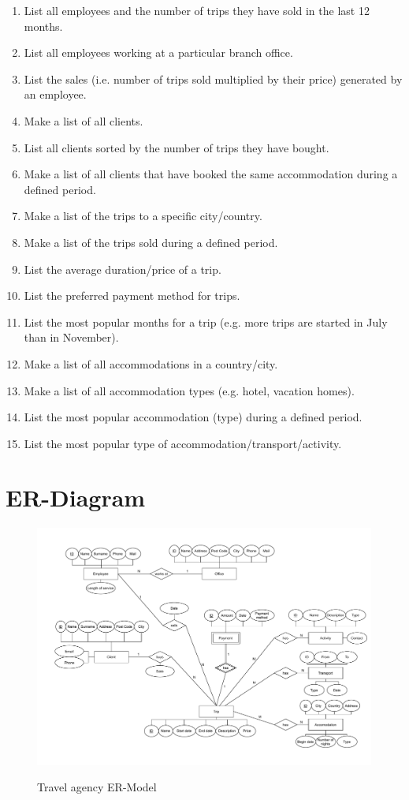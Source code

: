 \documentclass{article}
\begin{document}
			\begin{enumerate}
				\item List all employees and the number of trips they have sold in the last 12 months.
				\item List all employees working at a particular branch office.
				\item List the sales (i.e. number of trips sold multiplied by their price) generated by an employee. 
				\item Make a list of all clients.
				\item List all clients sorted by the number of trips they have bought.
				\item Make a list of all clients that have booked the same accommodation 	during a defined period.
				\item Make a list of the trips to a specific city/country. 
				\item Make a list of the trips sold during a defined period.
				\item List the average duration/price of a trip.
				\item List the preferred payment method for trips.
				\item List the most popular months for a trip (e.g. more trips are started in July than in November).
				\item Make a list of all accommodations in a country/city. 
				\item Make a list of all accommodation types (e.g. hotel, vacation homes).
				\item List the most popular accommodation (type) during a defined period.
				\item List the most popular type of accommodation/transport/activity.
			\end{enumerate}	

	\newpage
	
	\section*{ER-Diagram}
	\begin{figure}[htbp]
		\centering
			\includegraphics[width=1.15\textwidth, angle=90]{../Proposition 2.pdf}
		\label{ER-Model}
		\caption{Travel agency ER-Model}
	\end{figure}
	
\end{document}
